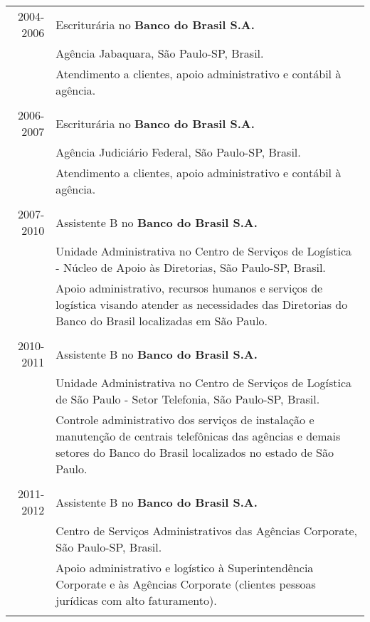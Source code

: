 \documentclass[a4paper,10pt]{article} %
\begin{document}
\begin{tabular}{r|p{11cm}}

\textsc{2004-2006} & Escriturária no \textbf{Banco do Brasil S.A.}\\
& Agência Jabaquara, São Paulo-SP, Brasil.\emph{}\\
& \footnotesize{Atendimento a clientes, apoio administrativo e contábil à agência.} \\
       \multicolumn{2}{c}{} \\
	

\textsc{2006-2007} & Escriturária no \textbf{Banco do Brasil S.A.}\\
& Agência Judiciário Federal, São Paulo-SP, Brasil.\emph{}\\
       & \footnotesize{Atendimento a clientes, apoio administrativo e contábil à agência.}\\
       \multicolumn{2}{c}{} \\
	

\textsc{2007-2010} & Assistente B no \textbf{Banco do Brasil S.A.}\\
& Unidade Administrativa no Centro de Serviços de Logística - Núcleo de Apoio às Diretorias, S\~ao Paulo-SP, Brasil.\emph{}\\
       & \footnotesize{Apoio administrativo, recursos humanos e serviços de logística visando atender as necessidades das Diretorias do Banco do Brasil localizadas em São Paulo.}\\       
	\multicolumn{2}{c}{} \\


\textsc{2010-2011} & Assistente B no \textbf{Banco do Brasil S.A.}\\
& Unidade Administrativa no Centro de Serviços de Logística de São Paulo - Setor Telefonia, S\~ao Paulo-SP, Brasil.\emph{}\\
& \footnotesize{Controle administrativo dos serviços de instalação e manutenção de centrais telefônicas das agências e demais setores do Banco do Brasil localizados no estado de São Paulo.}\\	
	\multicolumn{2}{c}{} \\



\textsc{2011-2012} & Assistente B no \textbf{Banco do Brasil S.A.}\\
& Centro de Serviços Administrativos das Agências Corporate, São Paulo-SP, Brasil. \emph{}\\
& \footnotesize{Apoio administrativo e logístico à Superintendência Corporate e às Agências Corporate (clientes pessoas jurídicas com alto faturamento).}\\
\multicolumn{2}{c}{} \\


\end{tabular}
\end{document}
